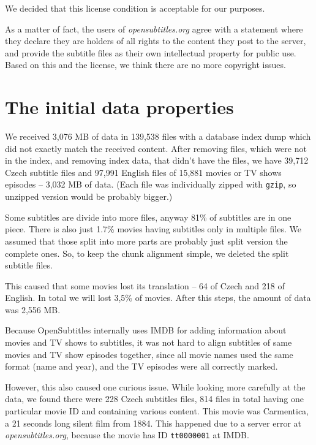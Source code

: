 \noindent We decided that this license condition is acceptable for our purposes. 

As a matter of fact, the users of \emph{opensubtitles.org} agree with a statement where they declare they are holders of all rights to the content they post to the server, and provide the subtitle files as their own intellectual property for public use. Based on this and the license, we think there are no more copyright issues.%


\section{The initial data properties}

We received 3,076 MB of data in 139,538 files with a database index dump which did not exactly match the received content. After removing files, which were not in the index, and removing index data, that didn't have the files, we have 39,712 Czech subtitle files and 97,991 English files of 15,881 movies or TV shows episodes -- 3,032 MB of data. (Each file was individually zipped with \texttt{gzip}, so unzipped version would be probably bigger.)

Some subtitles are divide into more files, anyway 81\% of subtitles are in one piece.
There is also just 1.7\% movies having subtitles only in multiple files. 
We assumed that those split into more parts are probably just split version the complete ones. 
So, to keep the chunk alignment simple, we deleted the split subtitle files.

This caused that some movies lost its translation -- 64
of Czech and 218 of English. In total we will lost 3,5\% of movies. After this steps, the amount of data was 2,556 MB.

Because OpenSubtitles internally uses IMDB for adding information about movies and TV shows to subtitles, it was not hard to align subtitles of same movies and TV show episodes together, since all movie names used the same format (name and year), and the TV episodes were all correctly marked.

However, this also caused one curious issue.
While looking more carefully at the data, we found there were 228 Czech subtitles files, 814 files in total having one particular movie ID and containing various content. This movie was Carmentica, a 21 seconds long silent film from 1884. This happened due to a server error at \emph{opensubtitles.org}, because the movie has ID {\tt tt0000001} at IMDB.


